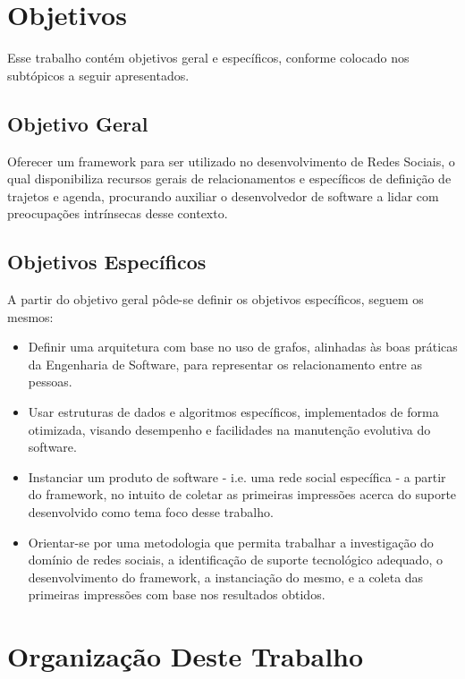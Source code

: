 \section{Objetivos}

Esse trabalho contém objetivos geral e específicos, conforme colocado nos subtópicos a seguir apresentados.

\subsection{Objetivo Geral}

Oferecer um framework para ser utilizado no desenvolvimento de Redes Sociais, o qual disponibiliza recursos gerais de relacionamentos e específicos de definição de trajetos e agenda, procurando auxiliar o desenvolvedor de software a lidar com preocupações intrínsecas desse contexto.

\subsection{Objetivos Específicos}

A partir do objetivo geral pôde-se definir os objetivos específicos, seguem os mesmos:

\begin{itemize}
	\item Definir uma arquitetura com base no uso de grafos, alinhadas às boas práticas da Engenharia de Software, para representar os relacionamento entre as pessoas.
	\item Usar estruturas de dados e algoritmos específicos, implementados de forma otimizada, visando desempenho e facilidades na manutenção evolutiva do software.
	\item Instanciar um produto de software - i.e. uma rede social específica - a partir do framework, no intuito de coletar as primeiras impressões acerca do suporte desenvolvido como tema foco desse trabalho.
	\item Orientar-se por uma metodologia que permita trabalhar a investigação do domínio de redes sociais, a identificação de suporte tecnológico adequado, o desenvolvimento do framework, a instanciação do mesmo, e a coleta das primeiras impressões com base nos resultados obtidos.
\end{itemize}

\section{Organização Deste Trabalho}

